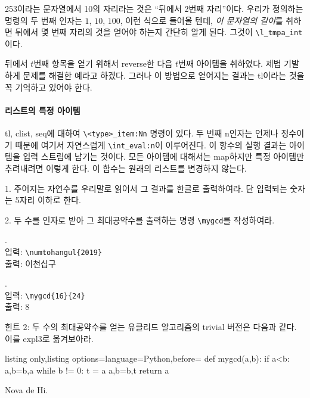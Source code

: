 \documentclass[a4paper,amsmath]{oblivoir}
\begin{document}

253이라는 문자열에서 10의 자리라는 것은 ``뒤에서 2번째 자리''이다. 우리가 정의하는 명령의 두 번째 인자는 $1$, $10$, $100$, 이런 식으로 들어올 텐데, \emph{이 문자열의 길이}를 취하면 뒤에서 몇 번째 자리의 것을 얻어야 하는지 간단히 알게 된다.  그것이 \verb|\l_tmpa_int|이다.

뒤에서 $t$번째 항목을 얻기 위해서 reverse한 다음 $t$번째 아이템을 취하였다. 제법 기발하게 문제를 해결한 예라고 하겠다. 그러나 이 방법으로 얻어지는 결과는 tl이라는 것을 꼭 기억하고 있어야 한다.

\paragraph{리스트의 특정 아이템}

tl, clist, seq에 대하여 \verb|\<type>_item:Nn| 명령이 있다. 두 번째 n인자는 언제나 정수이기 때문에 여기서 자연스럽게 \verb|\int_eval:n|이 이루어진다. 이 항수의 실행 결과는 아이템을 입력 스트림에 남기는 것이다. 모든 아이템에 대해서는 map하지만 특정 아이템만 추려내려면 이렇게 한다. 이 함수는 원래의 리스트를 변경하지 않는다.

\vfill

\begin{questionp}
 1. 주어지는 자연수를 우리말로 읽어서 그 결과를 한글로 출력하여라. 단 입력되는 숫자는 5자리 이하로 한다.

\bigskip

 2. 두 수를 인자로 받아 그 최대공약수를 출력하는 명령 \verb|\mygcd|를 작성하여라.

. \\
입력: \verb|\numtohangul{2019}| \\
출력: 이천십구

. \\
입력: \verb|\mygcd{16}{24}| \\
출력: 8
\end{questionp}

힌트 2: 두 수의 최대공약수를 얻는 유클리드 알고리즘의 trivial 버전은 다음과 같다. 이를 expl3로 옮겨보아라.

\begin{tcblisting}{listing only,listing options={language=Python},before={\medskip{}}}
def mygcd(a,b):
    if a<b:
        a,b=b,a
    while b != 0:
        t = a%
        a,b=b,t
    return a
\end{tcblisting}

\vfill
\hfill Nova de Hi.
\end{document}
